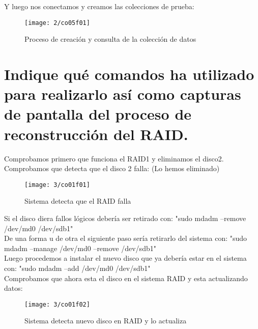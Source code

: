 Y luego nos conectamos y creamos las colecciones de prueba: \cite{c06} \\
\begin{figure}[H]
	\centering
	\texttt{[image: 2/co05f01]}
	\caption{Proceso de creación y consulta de la colección de datos}
	\label{fig:f10}
\end{figure}

\clearpage
\section{Indique qué comandos ha utilizado para realizarlo así como capturas de pantalla del proceso de reconstrucción del RAID. \cite{c07}}

Comprobamos primero que funciona el RAID1 y eliminamos el disco2. Comprobamos que detecta que el disco 2 falla: (Lo hemos eliminado)

\begin{figure}[H]
	\centering
	\texttt{[image: 3/co01f01]}
	\caption{Sistema detecta que el RAID falla}
	\label{fig:f11}
\end{figure}


Si el disco diera fallos lógicos debería ser retirado con: "sudo mdadm --remove /dev/md0 /dev/sdb1"\\

De una forma u de otra el siguiente paso sería retirarlo del sistema con: "sudo mdadm --manage /dev/md0 --remove /dev/sdb1"\\

Luego procedemos a instalar el nuevo disco que ya debería estar en el sistema con: "sudo mdadm --add /dev/md0 /dev/sdb1"\\

Comprobamos que ahora esta el disco en el sistema RAID y esta actualizando datos:

\begin{figure}[H]
	\centering
	\texttt{[image: 3/co01f02]}
	\caption{Sistema detecta nuevo disco en RAID y lo actualiza}
	\label{fig:f12}
\end{figure}


